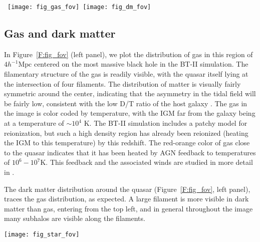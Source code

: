 \documentclass[twocolumn,useAMS,usenatbib]{mnras} \usepackage{natbib}
\newcommand{\hmpc}{\ensuremath{h^{-1}\mathrm{Mpc}}}
\begin{document}
\begin{figure*}
\vspace{-2cm}
\hbox{
\hspace{-2cm}
\texttt{[image: fig\_gas\_fov]}
\hspace{-1cm}
\texttt{[image: fig\_dm\_fov]} } 
\vspace{-1cm}
\caption{\label{F:fig_fov} Images showing the distribution of gas and  dark matter in the region centered at the most massive black hole of size $4\hmpc$ corresponding to the JWST field of view at $z=7.6$. {\em Top Left:} Distribution of gas where the intensity of the blue region represents the density and the color scale represents the temperature of the gas. {\em Top Right}: the corresponding dark matter density.}
\end{figure*}

\subsection{Gas and dark matter}  
  
In Figure~\ref{F:fig_fov} (left panel), we plot the distribution of gas in this region of $4\hmpc$ centered on the most massive black hole in the BT-II simulation. The filamentary structure of the gas is readily visible, with the quasar itself lying at the intersection of four filaments. The distribution of matter is visually fairly symmetric around the center, indicating that the asymmetry in the tidal field will be fairly low, consistent with the low D/T ratio
of the host galaxy \cite{2017MNRAS.467.4243D}. The gas in the image is color coded by temperature, with the IGM far from the galaxy being at a temperature
of $\sim 10^{4}$ K. The BT-II simulation includes a patchy model for reionization, but such a high density region has already been reionized (heating the IGM to this temperature) by this redshift. The
red-orange color of gas close to the quasar indicates that it has been heated by AGN feedback to temperatures of $10^{6}-10^{7}$K. This feedback and the associated winds are studied in more detail in \cite{2018arXiv.xx000x}.

The dark matter distribution around the quasar  (Figure~\ref{F:fig_fov}, left panel), traces the gas distribution, as expected. A large filament is more visible in dark matter than gas, entering from the top left, and in general throughout the image many subhalos are visible along the filaments. 

\begin{figure*}

\texttt{[image: fig\_star\_fov]}
\vspace{-1.2cm}
\caption{\label{F:fig_fov_star} Galaxies in the field of
view of JWST. 
Stellar densities are shown  increasing from  red to yellow. The labels indicate the absolute magnitudes of the brightest three galaxies in the restframe UV.}  
\end{figure*}
\end{document}
